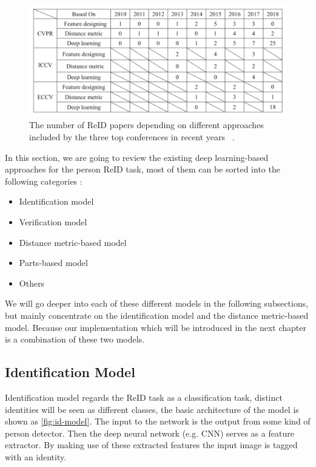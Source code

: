 \begin{figure}
    \includegraphics[width=\linewidth]{figures/papers_trend.png}
    \caption[Statistic of ReID related papers.]
    {The number of ReID papers depending on different approaches included by    
        the three top conferences in recent years
        ~\protect\cite{survey-on-dl-for-reid-2019}.}
    \label{fig:papers-trend}
\end{figure}

In this section, we are going to review the existing deep learning-based 
approaches for the person ReID task, most of them can be sorted into the 
following categories \cite{survey-on-dl-for-reid-2019}:

\begin{itemize}
    \item Identification model
    \item Verification model
    \item Distance metric-based model
    \item Parts-based model
    \item Others
\end{itemize}

We will go deeper into each of these different models in the following
subsections, but mainly concentrate on the identification model and the
distance metric-based model. Because our implementation which will be
introduced in the next chapter is a combination of these two models.

\subsection{Identification Model}
\label{sec:related-work-re-id-idm}

Identification model regards the ReID task as a classification task, distinct
identities will be seen as different classes, the basic architecture of the 
model is shown as \autoref{fig:id-model}. The input to the
network is the output from some kind of person detector. Then the deep
neural network (e.g. CNN) serves as a feature extractor. By making use of 
these extracted features the input image is tagged with an identity.

